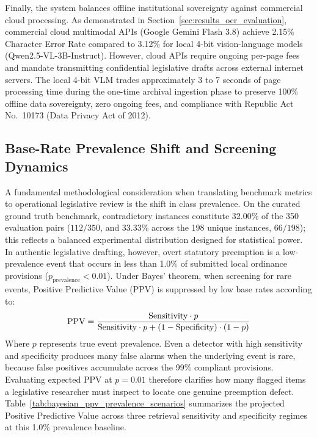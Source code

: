 Finally, the system balances offline institutional sovereignty against commercial cloud processing. As demonstrated in Section~\ref{sec:results_ocr_evaluation}, commercial cloud multimodal APIs (Google Gemini Flash 3.8) achieve 2.15\% Character Error Rate compared to 3.12\% for local 4-bit vision-language models (Qwen2.5-VL-3B-Instruct). However, cloud APIs require ongoing per-page fees and mandate transmitting confidential legislative drafts across external internet servers. The local 4-bit VLM trades approximately 3 to 7 seconds of page processing time during the one-time archival ingestion phase to preserve 100\% offline data sovereignty, zero ongoing fees, and compliance with Republic Act No.~10173 (Data Privacy Act of 2012).


\subsection{Base-Rate Prevalence Shift and Screening Dynamics}
\label{sec:prevalence_shift}

A fundamental methodological consideration when translating benchmark metrics to operational legislative review is the shift in class prevalence. On the curated ground truth benchmark, contradictory instances constitute 32.00\% of the 350 evaluation pairs ($112/350$, and 33.33\% across the 198 unique instances, $66/198$); this reflects a balanced experimental distribution designed for statistical power. In authentic legislative drafting, however, overt statutory preemption is a low-prevalence event that occurs in less than 1.0\% of submitted local ordinance provisions ($p_{\text{prevalence}} < 0.01$). Under Bayes' theorem, when screening for rare events, Positive Predictive Value (PPV) is suppressed by low base rates according to:
\begin{equation}
    \text{PPV} = \frac{\text{Sensitivity} \cdot p}{\text{Sensitivity} \cdot p + (1 - \text{Specificity}) \cdot (1 - p)}
    \label{eq:ppv_bayes}
    \eqcaption{Bayesian Positive Predictive Value Formulation}
\end{equation}
\noindent Where $p$ represents true event prevalence. Even a detector with high sensitivity and specificity produces many false alarms when the underlying event is rare, because false positives accumulate across the 99\% compliant provisions. Evaluating expected PPV at $p = 0.01$ therefore clarifies how many flagged items a legislative researcher must inspect to locate one genuine preemption defect. Table~\ref{tab:bayesian_ppv_prevalence_scenarios} summarizes the projected Positive Predictive Value across three retrieval sensitivity and specificity regimes at this 1.0\% prevalence baseline.

